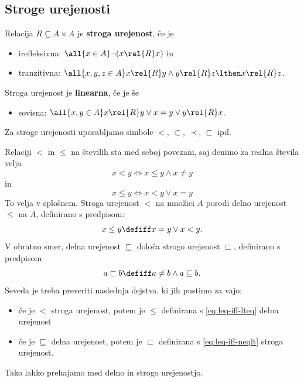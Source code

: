 \subsection{Stroge urejenosti}

\begin{definicija}
  Relacija $R \subseteq A \times A$ je \textbf{stroga urejenost}, če je
  \begin{itemize}
  \item irefleksivna: $\all{x \in A} \lnot (x \rel{R} x)$ in
  \item tranzitivna: $\all{x, y, z \in A} x \rel{R} y \land y \rel{R} z \lthen x \rel{R} z$.
  \end{itemize}
  Stroga urejenost je \textbf{linearna}, če je še
  \begin{itemize}
  \item sovisna: $\all{x, y \in A} x \rel{R} y \lor x = y \lor y \rel{R} x$.
  \end{itemize}
  Za stroge urejenosti uporabljamo simbole $<$, $\subset$, $\prec$, $\sqsubset$ ipd.
\end{definicija}

Relaciji $<$ in $\leq$ na številih sta med seboj povezani, saj denimo za realna števila velja
%
\begin{equation*}
  x < y \iff x \leq y \land x \neq y
\end{equation*}
%
in
%
\begin{equation}
  \label{eq:leq-iff-lteq}
  x \leq y \iff x < y \lor x = y
\end{equation}
%
To velja v splošnem. Stroga urejenost $<$ na množici $A$ porodi delno urejenost $\leq$ na $A$,
definirano s predpisom:
%
\begin{equation*}
    x \leq y  \defiff x = y \lor x < y.
\end{equation*}
%
V obratno smer, delna urejenost $\sqsubseteq$ določa strogo urejenost $\sqsubset$, definirano s predpisom
%
\begin{equation}
  \label{eq:leq-iff-neqlt}
  a \sqsubset b  \defiff  a \neq b \land a \sqsubseteq b.
\end{equation}
%
Seveda je treba preveriti naslednja dejstva, ki jih pustimo za vajo:
%
\begin{itemize}
\item če je $<$ stroga urejenost, potem je $\leq$ definirana s \eqref{eq:leq-iff-lteq} delna urejenost
\item če je $\sqsubseteq$ delna urejenost, potem je $\sqsubset$ definirana s \eqref{eq:leq-iff-neqlt} stroga urejenost.
\end{itemize}
%
Tako lahko prehajamo med delno in strogo urejenostjo.

